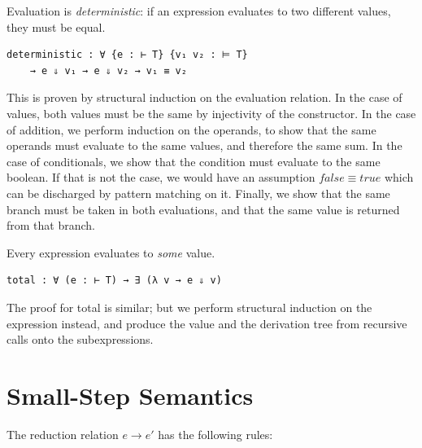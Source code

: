 Evaluation is \textit{deterministic}: if an expression evaluates to two different values, they must be equal.
\begin{verbatim}
deterministic : ∀ {e : ⊢ T} {v₁ v₂ : ⊨ T}
    → e ⇓ v₁ → e ⇓ v₂ → v₁ ≡ v₂
\end{verbatim}
This is proven by structural induction on the evaluation relation.
In the case of values, both values must be the same by injectivity of the constructor.
In the case of addition, we perform induction on the operands, to show that the same operands must evaluate to the same values, and therefore the same sum.
In the case of conditionals, we show that the condition must evaluate to the same boolean. If that is not the case, we would have an assumption {$false \equiv true$} which can be discharged by pattern matching on it.
Finally, we show that the same branch must be taken in both evaluations, and that the same value is returned from that branch.

Every expression evaluates to \textit{some} value.
\begin{verbatim}
total : ∀ (e : ⊢ T) → ∃ (λ v → e ⇓ v)
\end{verbatim}

The proof for total is similar; but we perform structural induction on the expression instead, and produce the value and the derivation tree from recursive calls onto the subexpressions.

\section{Small-Step Semantics}

The reduction relation $e \longrightarrow e'$ has the following rules:

